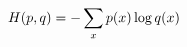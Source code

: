\documentclass[preview]{standalone}
\begin{document}
\begin{align*}
\special{dvisvgm:raw <g id='unique000'>}H(p, q) = -\sum_{x} p(x) \log q(x)\special{dvisvgm:raw </g>}
\end{align*}
\end{document}
